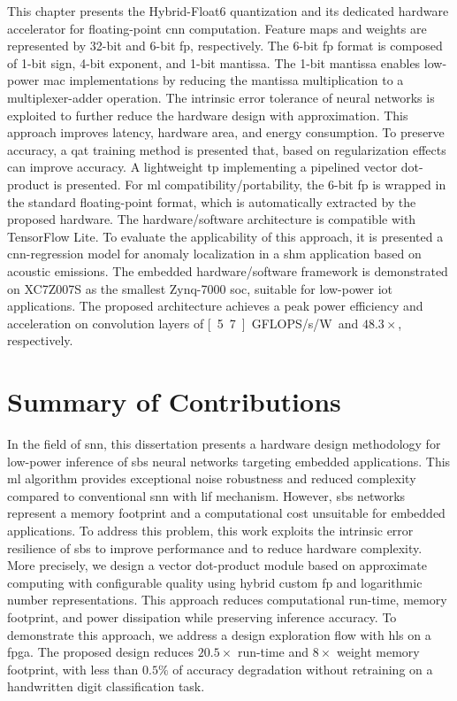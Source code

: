This chapter presents the Hybrid-Float6 quantization and its dedicated hardware accelerator for floating-point \gls{cnn} computation. Feature maps and weights are represented by 32-bit and 6-bit \gls{fp}, respectively. The 6-bit \gls{fp} format is composed of 1-bit sign, 4-bit exponent, and 1-bit mantissa. The 1-bit mantissa enables low-power \gls{mac} implementations by reducing the mantissa multiplication to a multiplexer-adder operation. The intrinsic error tolerance of neural networks is exploited to further reduce the hardware design with approximation. This approach improves latency, hardware area, and energy consumption. To preserve accuracy, a \gls{qat} training method is presented that, based on regularization effects can improve accuracy. A lightweight \gls{tp} implementing a pipelined vector dot-product is presented. For \gls{ml} compatibility/portability, the 6-bit \gls{fp} is wrapped in the standard floating-point format, which is automatically extracted by the proposed hardware. The hardware/software architecture is compatible with TensorFlow Lite. To evaluate the applicability of this approach, it is presented a \gls{cnn}-regression model for anomaly localization in a \gls{shm} application based on acoustic emissions. The embedded hardware/software framework is demonstrated on XC7Z007S as the smallest Zynq-7000 \gls{soc}, suitable for low-power \gls{iot} applications. The proposed architecture achieves a peak power efficiency and acceleration on convolution layers of \unit[5.7]{GFLOPS/s/W} and $48.3\times$, respectively.

\section{Summary of Contributions}

In the field of \gls{snn}, this dissertation presents a hardware design methodology for low-power inference of \gls{sbs} neural networks targeting embedded applications. This \gls{ml} algorithm provides exceptional noise robustness and reduced complexity compared to conventional \gls{snn} with \gls{lif} mechanism. However, \gls{sbs} networks represent a memory footprint and a computational cost unsuitable for embedded applications. To address this problem, this work exploits the intrinsic error resilience of \gls{sbs} to improve performance and to reduce hardware complexity. More precisely, we design a vector dot-product module based on approximate computing with configurable quality using hybrid custom \gls{fp} and logarithmic number representations. This approach reduces computational run-time, memory footprint, and power dissipation while preserving inference accuracy. To demonstrate this approach, we address a design exploration flow with \gls{hls} on a \gls{fpga}. The proposed design reduces $20.5\times$ run-time and $8\times$ weight memory footprint, with less than $0.5\%$ of accuracy degradation without retraining on a handwritten digit classification task.

